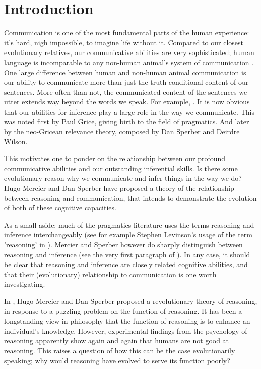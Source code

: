 \chapter*{Introduction}
\label{ch:introduction}


Communication is one of the most fundamental parts of the human experience: it's hard, nigh impossible, to imagine life without it. Compared to our closest evolutionary relatives, our communicative abilities are very sophisticated; human language is incomparable to any non-human animal's system of communication \citep{CheneySeyfarth98}.
One large difference between human and non-human animal communication is our ability to communicate more than just the truth-conditional content of our sentences. More often than not, the communicated content of the sentences we utter extends way beyond the words we speak. For example, .
It is now obvious that our abilities for inference play a large role in the way we communicate. This was noted first by Paul Grice, giving birth to the field of pragmatics. And later by the neo-Gricean relevance theory, composed by Dan Sperber and Deirdre Wilson.

This motivates one to ponder on the relationship between our profound communicative abilities and our outstanding inferential skills. Is there some evolutionary reason why we communicate and infer things in the way we do?
Hugo Mercier and Dan Sperber have proposed a theory of the relationship between reasoning and communication, that intends to demonstrate the evolution of both of these cognitive capacities.

As a small aside: much of the pragmatics literature uses the terms reasoning and inference interchangeably (see for example Stephen Levinson's usage of the term 'reasoning' in \citet[p.~218]{Levinson83}). Mercier and Sperber however do sharply distinguish between reasoning and inference (see the very first paragraph of \citet{MS11}).
In any case, it should be clear that reasoning and inference are closely related cognitive abilities, and that their (evolutionary) relationship to communication is one worth investigating.


In \citeyear{MS11}, Hugo Mercier and Dan Sperber proposed a revolutionary
theory of reasoning, in response to a puzzling problem on the function of reasoning.
It has been a longstanding view in philosophy that the function of reasoning is to enhance an individual's knowledge. However, experimental findings from the psychology of reasoning apparently show again and again that humans are not good at reasoning. This raises a question of how this can be the case evolutionarily speaking; why would reasoning have evolved to serve its function poorly?

